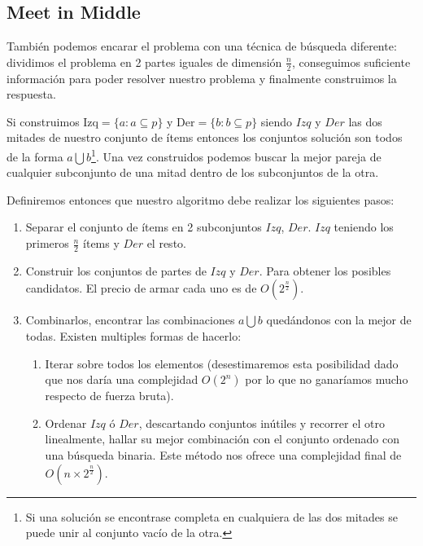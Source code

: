 \documentclass[fleqn, 11pt]{article}
\begin{document}
\subsection{Meet in Middle}

También podemos encarar el problema con una técnica de búsqueda diferente:
dividimos el problema en 2 partes iguales de dimensión $\frac{n}{2}$,
conseguimos suficiente información para poder resolver nuestro problema y
finalmente construimos la respuesta.

Si construimos $\text{Izq} = \{a : a \subseteq p\}$ y $\text{Der} = \{b : b
\subseteq p\}$ siendo $Izq$ y $Der$ las dos mitades de nuestro conjunto de ítems
entonces los conjuntos solución son todos de la forma $a \bigcup b$\footnote{Si
una solución se encontrase completa en cualquiera de las dos mitades se puede
unir al conjunto vacío de la otra.}. Una vez construidos podemos
buscar la mejor pareja de cualquier subconjunto de una mitad dentro de los
subconjuntos de la otra.

Definiremos entonces que nuestro algoritmo debe realizar los siguientes pasos:

\begin{enumerate}
\item Separar el conjunto de ítems en 2 subconjuntos $Izq$, $Der$. $Izq$ teniendo los primeros
$\frac{n}{2}$ ítems y $Der$ el resto.

\item Construir los conjuntos de partes de $Izq$ y $Der$. Para obtener los posibles
candidatos. El precio de armar cada uno es de $O(2^{\frac{n}{2}})$.

\item Combinarlos, encontrar las combinaciones $a \bigcup b$ quedándonos con la
mejor de todas. Existen multiples formas de hacerlo:

\begin{enumerate}
	\item Iterar sobre todos los elementos (desestimaremos esta posibilidad
	dado que nos daría una complejidad $O(2^n)$ por lo que no ganaríamos
	mucho respecto de fuerza bruta).

	\item Ordenar $Izq$ ó $Der$, descartando conjuntos inútiles y recorrer el otro linealmente, hallar su mejor combinación con el conjunto ordenado con una búsqueda binaria. Este método nos ofrece una complejidad final de
	$O(n \times 2^{\frac{n}{2}})$.
\end{enumerate}
\end{enumerate}
\end{document}
